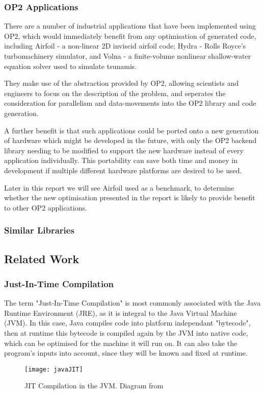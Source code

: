 \subsubsection{OP2 Applications}
There are a number of industrial applications that have been implemented using OP2, which would immediately benefit from any optimisation of generated code, including Airfoil \cite{airfoil} - a non-linear 2D inviscid airfoil code; Hydra \cite{hydra} - Rolls Royce’s turbomachinery simulator, and Volna \cite{volna} - a finite-volume nonlinear shallow-water equation solver used to simulate tsunamis.
\par
They make use of the abstraction provided by OP2, allowing scientists and engineers to focus on the description of the problem, and seperates the consideration for parallelism and data-movements into the OP2 library and code generation.
\par
A further benefit is that such applications could be ported onto a new generation of hardware which might be developed in the future, with only the OP2 backend library needing to be modified to support the new hardware instead of every application individually. This portability can save both time and money in development if multiple different hardware platforms are desired to be used.
\par
Later in this report we will see Airfoil used as a benchmark, to determine whether the new optimisation presented in the report is likely to provide benefit to other OP2 applications.

\subsubsection{Similar Libraries}

\subsection{Related Work}

\subsubsection{Just-In-Time Compilation}
\label{sec:rw_JIT}

\hspace{\parindent}
The term "Just-In-Time Compilation" is most commonly associated with the Java Runtime Environment (JRE), as it is integral to the Java Virtual Machine (JVM). In this case, Java compiles code into platform independant "bytecode", then at runtime this bytecode is compiled again by the JVM into native code, which can be optimised for the machine it will run on. It can also take the program's inputs into account, since they will be known and fixed at runtime.
\begin{figure}[h!]
  \centering
  \texttt{[image: javaJIT]}
  \caption{\label{fig:javaJIT} JIT Compilation in the JVM. Diagram from \cite{javaJITsrc}}
\end{figure}

